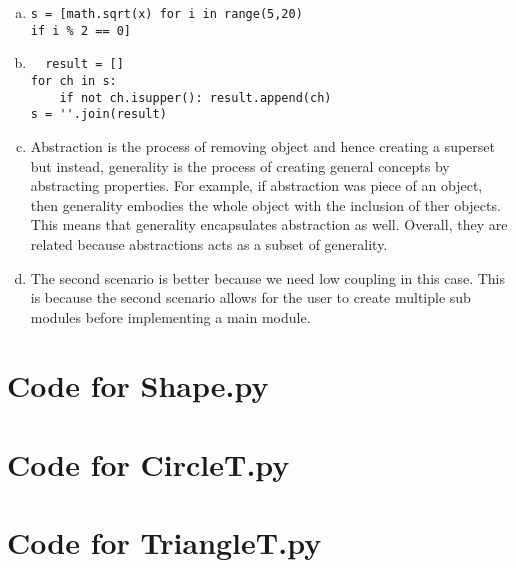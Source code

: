 \documentclass[12pt]{article}
\begin{document}
\begin{enumerate}[a)]
\item 
\begin {lstlisting}
s = [math.sqrt(x) for i in range(5,20)
if i %
\end{lstlisting}

\item
\begin {lstlisting}
  result = []
for ch in s:
    if not ch.isupper(): result.append(ch)
s = ''.join(result)
\end{lstlisting}

\item Abstraction is the process of removing object and hence creating a superset but instead, generality is the process of creating general concepts by
abstracting properties. For example, if abstraction was piece of an object, then generality embodies the whole object with the inclusion of ther objects.
This means that generality encapsulates abstraction as well. Overall, they are related because abstractions acts as a subset of generality.

\item The second scenario is better because we need low coupling in this case. This is because the second scenario allows for the user to create multiple
sub modules before implementing a main module.

\end{enumerate}

\newpage

\lstset{language=Python, basicstyle=\tiny, breaklines=true, showspaces=false,
  showstringspaces=false, breakatwhitespace=true}

\def\thesection{\Alph{section}}

\section{Code for Shape.py}

\noindent 

\newpage

\section{Code for CircleT.py}

\noindent 

\newpage

\section{Code for TriangleT.py}
\end{document}
